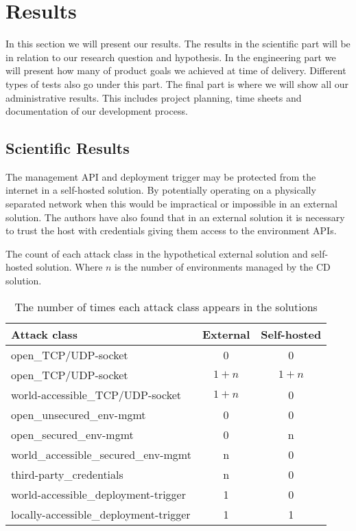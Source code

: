 \chapter{Results}
\label{chap:results}

In this section we will present our results. The results in the scientific part will be in relation to our research question and hypothesis. In the engineering part we will present how many of product goals we achieved at time of delivery. Different types of tests also go under this part. The final part is where we will show all our administrative results. This includes project planning, time sheets and documentation of our development process.

\section{Scientific Results}
The management API and deployment trigger may be protected from the internet in a self-hosted solution. By potentially operating on a physically separated network when this would be impractical or impossible in an external solution. The authors have also found that in an external solution it is necessary to trust the host with credentials giving them access to the environment APIs.


The count of each attack class in the hypothetical external solution and self-hosted solution. Where $n$ is the number of environments managed by the \acrshort{CD} solution.
\begin{table}[ht]
    \begin{tabularx}{\textwidth}{|X|c|c|}
        \hline
        \textbf{Attack class}                  & \textbf{External} & \textbf{Self-hosted}\\ \hline \hline
        open\_TCP/UDP-socket                   & 0 & 0        \\ \hline
        open\_TCP/UDP-socket                   & $1+n$ & $1+n$\\ \hline
        world-accessible\_TCP/UDP-socket       & $1+n$ & 0    \\ \hline
        open\_unsecured\_env-mgmt              & 0     & 0    \\ \hline
        open\_secured\_env-mgmt                & 0     & n    \\ \hline
        world\_accessible\_secured\_env-mgmt   & n     & 0    \\ \hline
        third-party\_credentials               & n     & 0    \\ \hline
        world-accessible\_deployment-trigger   & 1     & 0    \\ \hline
        locally-accessible\_deployment-trigger & 1     & 1    \\ \hline
    \end{tabularx}
    \caption{The number of times each attack class appears in the solutions}
    \label{tab:result1}
\end{table}

